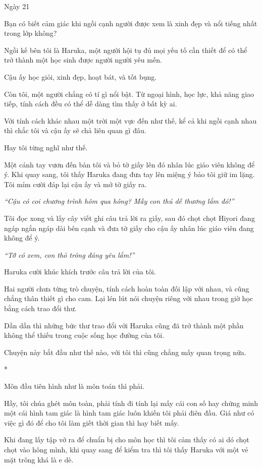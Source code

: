 {Ngày 21}
{
Bạn có biết cảm giác khi ngồi cạnh người được xem là xinh đẹp và nổi
tiếng nhất trong lớp không?

Ngồi kế bên tôi là Haruka, một người hội tụ đủ mọi yếu tố cần thiết để
có thể trở thành một học sinh được người người yêu mến.

Cậu ấy học giỏi, xinh đẹp, hoạt bát, và tốt bụng.

Còn tôi, một người chẳng có tí gì nổi bật. Từ ngoại hình, học lực, khả
năng giao tiếp, tính cách đều có thể dễ dàng tìm thấy ở bất kỳ ai.

Với tính cách khác nhau một trời một vực đến như thế, kể cả khi ngồi
cạnh nhau thì chắc tôi và cậu ấy sẽ chả liên quan gì đâu.

Hay tôi từng nghĩ như thế.

Một cánh tay vươn đến bàn tôi và bỏ tờ giấy lên đó nhân lúc giáo viên
không để ý. Khi quay sang, tôi thấy Haruka đang đưa tay lên miệng ý bảo
tôi giữ im lặng. Tôi mỉm cười đáp lại cậu ấy và mở tờ giấy ra.

\emph{``Cậu có coi chương trình hôm qua hông? Mấy con thú dễ thương lắm
    đó!''}

Tôi đọc xong và lấy cây viết ghi câu trả lời ra giấy, sau đó chọt chọt
Hiyori đang ngáp ngắn ngáp dài bên cạnh và đưa tờ giấy cho cậu ấy nhân
lúc giáo viên đang không để ý.

\emph{``Tớ có xem, con thỏ trông đáng yêu lắm!''}

Haruka cười khúc khích trước câu trả lời của tôi.

Hai người chưa từng trò chuyện, tính cách hoàn toàn đối lập với nhau, và
cũng chẳng thân thiết gì cho cam. Lại lén lút nói chuyện riêng với nhau
trong giờ học bằng cách trao đổi thư.

Dần dần thì những bức thư trao đổi với Haruka cũng đã trở thành một phần
không thể thiếu trong cuộc sống học đường của tôi.

Chuyện này bắt đầu như thế nào, với tôi thì cũng chẳng mấy quan trọng
nữa.

*

Môn đầu tiên hình như là môn toán thì phải.

Hầy, tôi chúa ghét môn toàn, phải tính đi tính lại mấy cái con số hay
chứng minh một cái hình tam giác là hình tam giác luôn khiến tôi phải
điên đầu. Giá như có việc gì đó để cho tôi làm giết thời gian thì hay
biết mấy.

Khi đang lấy tập vở ra để chuẩn bị cho môn học thì tôi cảm thấy có ai dó
chọt chọt vào hông mình, khi quay sang để kiểm tra thì tôi thấy Haruka
với một vẻ mặt trông khá là e dè.

}
